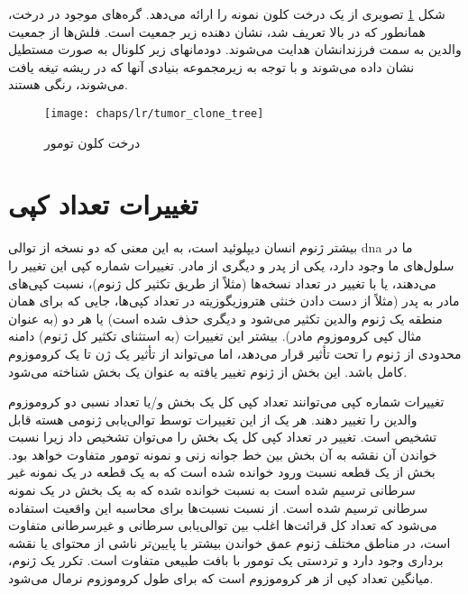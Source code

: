 شکل \ref{fig:ch_lr:tumor_clone_tree} تصویری از یک درخت کلون نمونه را ارائه می‌دهد. گره‌های موجود در درخت، همانطور که در بالا تعریف شد، نشان دهنده زیر جمعیت است. فلش‌ها از جمعیت والدین به سمت فرزندانشان هدایت می‌شوند. دودمانهای زیر کلونال به صورت مستطیل نشان داده می‌شوند و با توجه به زیرمجموعه بنیادی آنها که در ریشه تیغه یافت می‌شوند، رنگی هستند.


\begin{figure}[!ht]
	\centerline{\texttt{[image: chaps/lr/tumor\_clone\_tree]}}
	\caption{درخت کلون تومور}
	\label{fig:ch_lr:tumor_clone_tree}
\end{figure}




\section{تغییرات تعداد کپی}

بیشتر ژنوم انسان دیپلوئید است، به این معنی که دو نسخه از توالی \gls{dna} ما در سلول‌های ما وجود دارد، یکی از پدر و دیگری از مادر. تغییرات شماره کپی این تغییر را می‌دهند، یا با تغییر در تعداد نسخه‌ها (مثلاً از طریق تکثیر کل ژنوم)، نسبت کپی‌های مادر به پدر (مثلاً از دست دادن خنثی هتروزیگوزیته در تعداد کپی‌ها، جایی که برای همان منطقه یک ژنوم والدین تکثیر می‌شود و دیگری حذف شده است) یا هر دو (به عنوان مثال کپی کروموزوم مادر). بیشتر این تغییرات (به استثنای تکثیر کل ژنوم) دامنه محدودی از ژنوم را تحت تأثیر قرار می‌دهد، اما می‌تواند از تأثیر یک ژن تا یک کروموزوم کامل باشد. این بخش از ژنوم تغییر یافته به عنوان یک بخش شناخته می‌شود.


تغییرات شماره کپی می‌توانند تعداد کپی کل یک بخش و/یا تعداد نسبی دو کروموزوم والدین را تغییر دهند. هر یک از این تغییرات توسط توالی‌یابی ژنومی هسته قابل تشخیص است. تغییر در تعداد کپی کل یک بخش را می‌توان تشخیص داد زیرا نسبت خواندن آن نقشه به آن بخش بین خط جوانه زنی و نمونه تومور متفاوت خواهد بود. بخش از یک قطعه نسبت ورود خوانده شده است که به یک قطعه در یک نمونه غیر سرطانی ترسیم شده است به نسبت خوانده شده که به یک بخش در یک نمونه سرطانی ترسیم شده است. از نسبت نسبت‌ها برای محاسبه این واقعیت استفاده می‌شود که تعداد کل قرائت‌ها اغلب بین توالی‌یابی سرطانی و غیرسرطانی متفاوت است، در مناطق مختلف ژنوم عمق خواندن بیشتر یا پایین‌تر ناشی از محتوای  یا نقشه برداری وجود دارد و تردستی یک تومور با بافت طبیعی متفاوت است. تکرر یک ژنوم، میانگین تعداد کپی از هر کروموزوم است که برای طول کروموزوم نرمال می‌شود.


